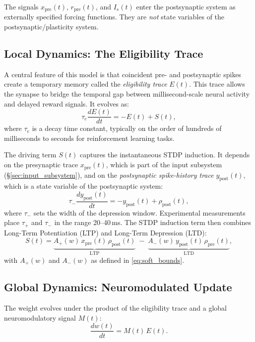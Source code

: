 \documentclass[11pt]{article}
\theoremstyle{definition}
\begin{document}
The signals $x_{\mathrm{pre}}(t)$, $r_{\mathrm{pre}}(t)$, and $I_s(t)$ enter the postsynaptic system as externally specified forcing functions. They are \emph{not} state variables of the postsynaptic/plasticity system.

\subsection{Local Dynamics: The Eligibility Trace}
A central feature of this model is that coincident pre- and postsynaptic spikes create a temporary memory called the \textit{eligibility trace} $E(t)$.
This trace allows the synapse to bridge the temporal gap between millisecond-scale neural activity and delayed reward signals. It evolves as:
\begin{equation} \label{eq:eligibility}
    \tau_e \frac{dE(t)}{dt} = -E(t) + S(t),
\end{equation}
where $\tau_e$ is a decay time constant, typically on the order of hundreds of milliseconds to seconds for reinforcement learning tasks.

The driving term $S(t)$ captures the instantaneous STDP induction. It depends on the presynaptic trace $x_{\mathrm{pre}}(t)$, which is part of the input subsystem (\S\ref{sec:input_subsystem}), and on the \textit{postsynaptic spike-history trace} $y_{\mathrm{post}}(t)$, which is a state variable of the postsynaptic system:
\begin{equation}
    \tau_- \frac{dy_{\mathrm{post}}(t)}{dt} = -y_{\mathrm{post}}(t) + \rho_{\mathrm{post}}(t), \label{eq:post_trace}
\end{equation}
where $\tau_-$ sets the width of the depression window. Experimental measurements place $\tau_+$ and $\tau_-$ in the range 20--40\,ms.
The STDP induction term then combines Long-Term Potentiation (LTP) and Long-Term Depression (LTD):
\begin{equation} \label{eq:stdp_induction}
    S(t) = \underbrace{A_+(w)\, x_{\mathrm{pre}}(t)\, \rho_{\mathrm{post}}(t)}_{\text{LTP}} \;-\; \underbrace{A_-(w)\, y_{\mathrm{post}}(t)\, \rho_{\mathrm{pre}}(t)}_{\text{LTD}},
\end{equation}
with $A_+(w)$ and $A_-(w)$ as defined in \eqref{eq:soft_bounds}.

\subsection{Global Dynamics: Neuromodulated Update}
The weight evolves under the product of the eligibility trace and a global neuromodulatory signal $M(t)$:
\begin{equation} \label{eq:weight_update}
    \frac{dw(t)}{dt} = M(t)\, E(t).
\end{equation}
\end{document}
